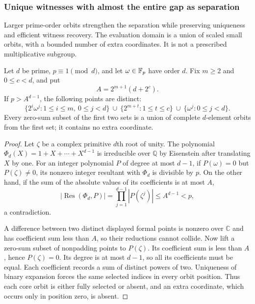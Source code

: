 \subsubsection{Unique witnesses with almost the entire gap as separation}
\label{sec:unique-orbits}

Larger prime-order orbits strengthen the separation while preserving
uniqueness and efficient witness recovery. The evaluation domain is a
union of scaled small orbits, with a bounded number of extra coordinates.
It is not a prescribed multiplicative subgroup.

\begin{lemma}
\label{ou:root-sums}
Let $d$ be prime, $p\equiv1\pmod d$, and let $\omega\in\mathbb F_p$ have
order $d$. Fix $m\ge2$ and $0\le c<d$, and put
\[
 A=2^{m+1}(d+2^c).
\]
If $p>A^{d-1}$, the following points are distinct:
\[
 \{2^i\omega^j:1\le i\le m,\ 0\le j<d\}
 \ \cup\ \{2^{m+t}:1\le t\le c\}
 \ \cup\ \{\omega^j:0\le j<d\}.
\]
Every zero-sum subset of the first two sets is a union of complete
$d$-element orbits from the first set; it contains no extra coordinate.
\end{lemma}
\begin{proof}
Let $\zeta$ be a complex primitive $d$th root of unity. The polynomial
$\Phi_d(X)=1+X+\cdots+X^{d-1}$ is irreducible over $\mathbb Q$ by Eisenstein
after translating $X$ by one. For an integer polynomial $P$ of degree
at most $d-1$, if $P(\omega)=0$ but $P(\zeta)\ne0$, its nonzero
integer resultant with $\Phi_d$ is divisible by $p$. On the other hand,
if the sum of the absolute values of its coefficients is at most $A$,
\[
 |\operatorname{Res}(\Phi_d,P)|
 =\prod_{j=1}^{d-1}|P(\zeta^j)|\le A^{d-1}<p,
\]
a contradiction.

A difference between two distinct displayed formal points is nonzero
over $\mathbb C$ and has coefficient sum less than $A$, so their reductions
cannot collide. Now lift a zero-sum subset of nonpadding points to
$P(\zeta)$. Its coefficient sum is less than $A$, hence $P(\zeta)=0$.
Its degree is at most $d-1$, so all its coefficients must be equal.
Each coefficient records a sum of distinct powers of two. Uniqueness
of binary expansion forces the same selected indices in every orbit
position. Thus each core orbit is either fully selected or absent,
and an extra coordinate, which occurs only in position zero, is absent.
\end{proof}

